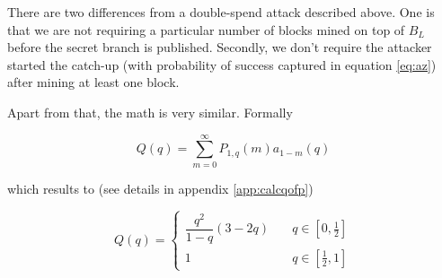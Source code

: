 \documentclass[letterpaper,12pt]{report}
\theoremstyle{plain}
\theoremstyle{definition}
\begin{document}
There are two differences from a double-spend attack described above. One is that we are not requiring a particular number of blocks mined on top of $\mathit{B}_L$ before the secret branch is published. Secondly, we don't require the attacker started the catch-up (with probability of success captured in equation \ref{eq:az}) after mining at least one block. 

Apart from that, the math is very similar. Formally 

\begin{equation}\label{eq:qofpdef}
\mathit{Q}(q)=\sum_{m=0}^{\infty}\mathit{P}_{1,q}(m)\mathit{a}_{1-m}(q)
\end{equation}

which results to (see details in appendix \ref{app:calcqofp})

\begin{equation}\label{eq:qofp}
\mathit{Q}(q)=
\begin{cases}
\dfrac{q^2}{1-q}\left(
3-2q
\right) & \quad q \in [0,\frac{1}{2}] \\
1 & \quad q \in [\frac{1}{2},1] 
\end{cases}
\end{equation}
\end{document}
